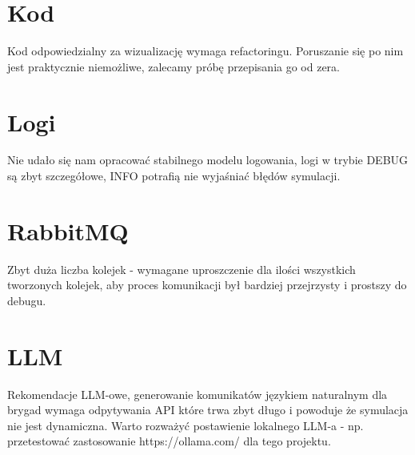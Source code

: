 \documentclass[11pt,a4paper]{article}
\begin{document}
\section{Kod}
Kod odpowiedzialny za wizualizację wymaga refactoringu. Poruszanie się po nim jest praktycznie niemożliwe, zalecamy próbę przepisania go od zera. 

\section{Logi}
Nie udało się nam opracować stabilnego modelu logowania, logi w trybie DEBUG są zbyt szczegółowe, INFO potrafią nie wyjaśniać błędów symulacji. 

\section{RabbitMQ}
Zbyt duża liczba kolejek - wymagane uproszczenie dla ilości wszystkich tworzonych kolejek, aby proces komunikacji był bardziej przejrzysty i prostszy do debugu. 

\section{LLM}
Rekomendacje LLM-owe, generowanie komunikatów językiem naturalnym dla brygad wymaga odpytywania API które trwa zbyt długo i powoduje że symulacja nie jest dynamiczna. Warto rozważyć postawienie lokalnego LLM-a - np. przetestować zastosowanie https://ollama.com/ dla tego projektu. 
\end{document}

